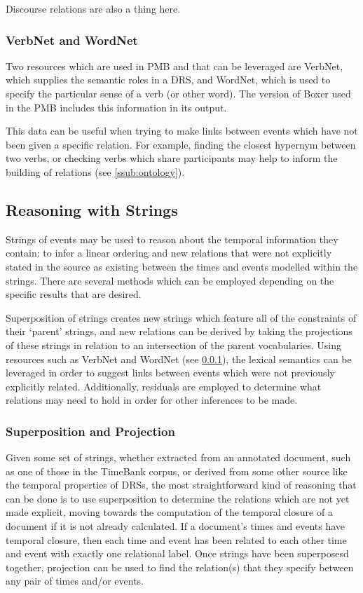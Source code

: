 \documentclass[a4paper,12pt,leqno]{article}
\begin{document}
Discourse relations are also a thing here.

\subsubsection{VerbNet and WordNet}\label{ssub:verbwordnet}
Two resources which are used in PMB and that can be leveraged are VerbNet, which supplies the semantic roles in a DRS, and WordNet, which is used to specify the particular sense of a verb (or other word). The version of Boxer used in the PMB includes this information in its output.

This data can be useful when trying to make links between events which have not been given a specific relation. For example, finding the closest hypernym between two verbs, or checking verbs which share participants may help to inform the building of relations (see \cref{ssub:ontology}).

\subsection{Reasoning with Strings}\label{sub:reasoning}
Strings of events may be used to reason about the temporal information they contain: to infer a linear ordering and new relations that were not explicitly stated in the source as existing between the times and events modelled within the strings. There are several methods which can be employed depending on the specific results that are desired.

Superposition of strings creates new strings which feature all of the constraints of their `parent' strings, and new relations can be derived by taking the projections of these strings in relation to an intersection of the parent vocabularies. Using resources such as VerbNet and WordNet (see \cref{ssub:verbwordnet}), the lexical semantics can be leveraged in order to suggest links between events which were not previously explicitly related. Additionally, residuals are employed to determine what relations may need to hold in order for other inferences to be made.

\subsubsection{Superposition and Projection}\label{ssub:superposition}
Given some set of strings, whether extracted from an annotated document, such as one of those in the TimeBank \citep{pustejovsky2006timebank} corpus, or derived from some other source like the temporal properties of DRSs, the most straightforward kind of reasoning that can be done is to use superposition to determine the relations which are not yet made explicit, moving towards the computation of the temporal closure of a document if it is not already calculated. If a document's times and events have temporal closure, then each time and event has been related to each other time and event with exactly one relational label. Once strings have been superposesd together, projection can be used to find the relation(s) that they specify between any pair of times and/or events.
\end{document}

